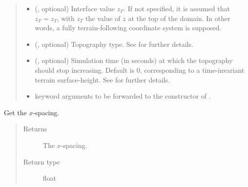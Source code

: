 \documentclass[letterpaper,10pt,english]{sphinxmanual}
\begin{document}
\begin{fulllineitems}
\begin{fulllineitems}
\begin{quote}
\begin{description}
\begin{itemize}
\item {} 
 (, optional) \textendash{} Interface value \(z_F\). If not specified,
it is assumed that \(z_F = z_T\), with \(z_T\) the value of \(z\)
at the top of the domain. In other words, a fully terrain-following coordinate
system is supposed.

\item {} 
 (, optional) \textendash{} Topography type. See {\hyperref[\detokenize{api:module-grids.topography}]{}}
for further details.

\item {} 
 (, optional) \textendash{} Simulation time (in seconds) at which the topography
should stop increasing. Default is 0, corresponding to a time-invariant terrain
surface-height. See  for further details.

\item {} 
 \textendash{} keyword arguments to be forwarded to the constructor of
{\hyperref[\detokenize{api:grids.topography.Topography2d}]{}}.

\end{itemize}

\end{description}\end{quote}

\end{fulllineitems}


\begin{fulllineitems}
\label{\detokenize{api:grids.xyz_grid.XYZGrid.dx}}
Get the \(x\)-spacing.
\begin{quote}\begin{description}
\item[{Returns}] \leavevmode
The \(x\)-spacing.

\item[{Return type}] \leavevmode
float

\end{description}\end{quote}

\end{fulllineitems}


\end{fulllineitems}
\end{document}
